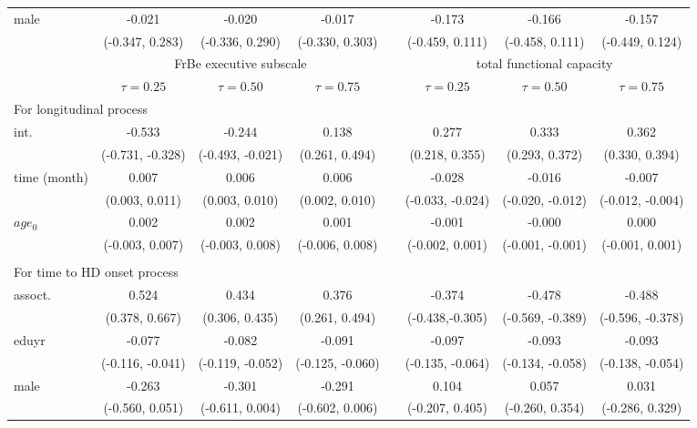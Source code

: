 \begin{table}[H]
{\begin{tabular}{l ccc r ccc}
male & -0.021 & -0.020 & -0.017 && -0.173 & -0.166 & -0.157 \\
  & (-0.347, 0.283)& (-0.336, 0.290) & (-0.330, 0.303) && (-0.459, 0.111) & (-0.458, 0.111) & (-0.449, 0.124) \\
  \hline
  \hline
  & \multicolumn{3}{c}{{FrBe executive subscale}}&& \multicolumn{3}{c}{{total functional capacity}}\\
  \hline
  & $\tau=0.25$ & $\tau=0.50$ & $\tau=0.75$ & & $\tau=0.25$ & $\tau=0.50$ & $\tau=0.75$ \\
\hline
\multicolumn{8}{l}{For longitudinal process}\\
int. & -0.533 & -0.244 & 0.138 && 0.277  & 0.333 & 0.362  \\
  & (-0.731, -0.328) & (-0.493, -0.021) & (0.261, 0.494) && (0.218, 0.355) & (0.293, 0.372) &  (0.330, 0.394)\\

time (month) & 0.007 & 0.006 & 0.006 && -0.028 & -0.016 & -0.007 \\
  & (0.003, 0.011) & (0.003, 0.010) & (0.002, 0.010) && (-0.033, -0.024) & (-0.020, -0.012) &  (-0.012, -0.004)\\

$age_0$ & 0.002 & 0.002 & 0.001 && -0.001  & -0.000 & 0.000 \\
  & (-0.003, 0.007) & (-0.003, 0.008) & (-0.006, 0.008) && (-0.002, 0.001) & (-0.001, -0.001) &  (-0.001, 0.001)\\\\

\multicolumn{8}{l}{For time to HD onset process}\\
assoct. &  0.524 & 0.434 & 0.376 && -0.374 & -0.478 &  -0.488\\
  & (0.378, 0.667) & (0.306, 0.435) & (0.261, 0.494) && (-0.438,-0.305) & (-0.569, -0.389) &  (-0.596, -0.378)\\

eduyr & -0.077 & -0.082 & -0.091 && -0.097 & -0.093 &  -0.093 \\
  & (-0.116, -0.041) & (-0.119, -0.052) & (-0.125, -0.060) && (-0.135, -0.064) & (-0.134, -0.058) &  (-0.138, -0.054) \\

male & -0.263 & -0.301 & -0.291 && 0.104 & 0.057 & 0.031 \\
  & (-0.560, 0.051) & (-0.611, 0.004) & (-0.602, 0.006) && (-0.207, 0.405) & (-0.260, 0.354) &  (-0.286, 0.329) \\
  \hline
\end{tabular}
}
\end{table}


